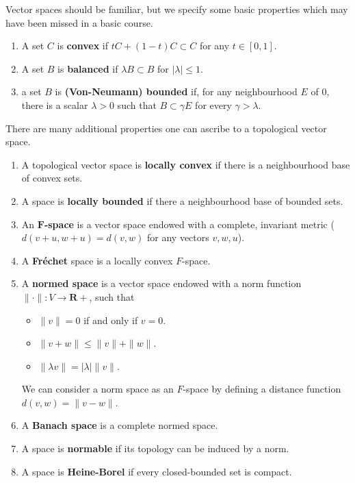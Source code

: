 \begin{definition}
Vector spaces should be familiar, but we specify some basic properties which may have been missed in a basic course.
\begin{enumerate}
    \item A set $C$ is {\bf convex} if $tC + (1 - t)C \subset C$ for any $t \in [0,1]$.
    \item A set $B$ is {\bf balanced} if $\lambda B \subset B$ for $| \lambda | \leq 1$.
    \item a set $B$ is {\bf (Von-Neumann) bounded} if, for any neighbourhood $E$ of 0, there is a scalar $\lambda > 0$ such that $B \subset \gamma E$ for every $\gamma > \lambda$.
\end{enumerate}
\end{definition}

\begin{definition}
    There are many additional properties one can ascribe to a topological vector space.
    \begin{enumerate}
        \item A topological vector space is {\bf locally convex} if there is a neighbourhood base of convex sets.
        \item A space is {\bf locally bounded} if there a neighbourhood base of bounded sets.
        \item An {\bf $\mathbf{F}$-space} is a vector space endowed with a complete, invariant metric ($d(v + u, w + u) = d(v,w)$ for any vectors $v,w,u$).
        \item A {\bf Fr\'{e}chet} space is a locally convex $F$-space.
        \item A {\bf normed space} is a vector space endowed with a norm function $\| \cdotp \|: V \to \mathbf{R}+$, such that
        \begin{itemize}
            \item $\| v \| = 0$ if and only if $v = 0$.
            \item $\| v + w \| \leq \| v \| + \| w \|$.
            \item $\| \lambda v \| = | \lambda | \| v \|$.
        \end{itemize}
        We can consider a norm space as an $F$-space by defining a distance function $d(v,w) = \| v - w \|$.
        \item A {\bf Banach space} is a complete normed space.
        \item A space is {\bf normable} if its topology can be induced by a norm.
        \item A space is {\bf Heine-Borel} if every closed-bounded set is compact.
    \end{enumerate}
\end{definition}

